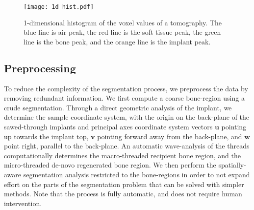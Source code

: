 \documentclass[pdflatex,sn-mathphys]{sn-jnl}%
\theoremstyle{thmstyleone}%
\theoremstyle{thmstyletwo}%
\theoremstyle{thmstylethree}%
\begin{document}
\begin{figure}
    \centering
    \texttt{[image: 1d\_hist.pdf]}
    \caption{1-dimensional histogram of the voxel values of a tomography. The blue line is air peak,
    the red line is the soft tissue peak, the green line is the bone peak, and the orange line is
    the implant peak.}
    \label{fig:1d-hist}
\end{figure}

\subsection{Preprocessing}\label{sec:preprocess}
To reduce the complexity of the segmentation process, we preprocess
the data by removing redundant information.
We first compute a coarse bone-region using a crude segmentation. Through a
direct geometric analysis of the implant, we determine the sample coordinate
system, with the origin on the back-plane of the sawed-through implants and
principal axes coordinate system vectors $\mathbf{u}$ pointing up towards the
implant top, $\mathbf{v}$ pointing forward away from the back-plane, and
$\mathbf{w}$ point right, parallel to the back-plane. An automatic
wave-analysis of the threads computationally determines the macro-threaded
recipient bone region, and the micro-threaded de-novo regenerated bone region.
We then perform the spatially-aware segmentation analysis restricted to the
bone-regions in order to not expand effort on the parts of the segmentation
problem that can be solved with simpler methods. Note that the process is fully
automatic, and does not require human intervention.


\end{document}
